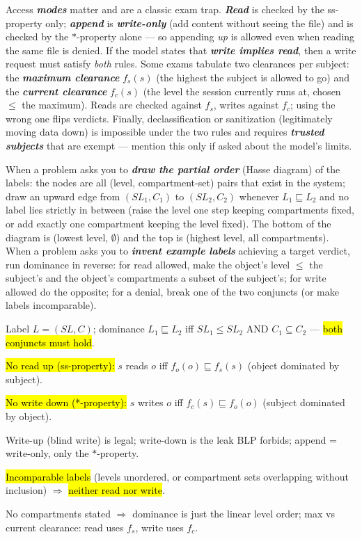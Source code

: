 \documentclass[12pt, a4paper]{article}
\newcommand{\term}[1]{\textbf{\textit{#1}}}        %
\newcommand{\imp}[1]{\hl{#1}}                       %
\begin{document}
Access \term{modes} matter and are a classic exam trap. \term{Read} is checked by the ss-property only; \term{append} is \term{write-only} (add content without seeing the file) and is checked by the $*$-property alone --- so appending \emph{up} is allowed even when reading the same file is denied. If the model states that \term{write implies read}, then a write request must satisfy \emph{both} rules. Some exams tabulate two clearances per subject: the \term{maximum clearance} $f_s(s)$ (the highest the subject is allowed to go) and the \term{current clearance} $f_c(s)$ (the level the session currently runs at, chosen $\leq$ the maximum). Reads are checked against $f_s$, writes against $f_c$; using the wrong one flips verdicts. Finally, declassification or sanitization (legitimately moving data down) is impossible under the two rules and requires \term{trusted subjects} that are exempt --- mention this only if asked about the model's limits.

When a problem asks you to \term{draw the partial order} (Hasse diagram) of the labels: the nodes are all (level, compartment-set) pairs that exist in the system; draw an upward edge from $(SL_1, C_1)$ to $(SL_2, C_2)$ whenever $L_1 \sqsubseteq L_2$ and no label lies strictly in between (raise the level one step keeping compartments fixed, or add exactly one compartment keeping the level fixed). The bottom of the diagram is (lowest level, $\emptyset$) and the top is (highest level, all compartments). When a problem asks you to \term{invent example labels} achieving a target verdict, run dominance in reverse: for read allowed, make the object's level $\leq$ the subject's and the object's compartments a subset of the subject's; for write allowed do the opposite; for a denial, break one of the two conjuncts (or make labels incomparable).

\begin{theorybox}
\begin{tightitem}
    \item Label $L = (SL, C)$; dominance $L_1 \sqsubseteq L_2$ iff $SL_1 \leq SL_2$ AND $C_1 \subseteq C_2$ --- \imp{both conjuncts must hold}.
    \item \imp{No read up (ss-property):} $s$ reads $o$ iff $f_o(o) \sqsubseteq f_s(s)$ (object dominated by subject).
    \item \imp{No write down (*-property):} $s$ writes $o$ iff $f_c(s) \sqsubseteq f_o(o)$ (subject dominated by object).
    \item Write-up (blind write) is legal; write-down is the leak BLP forbids; append = write-only, only the $*$-property.
    \item \imp{Incomparable labels} (levels unordered, or compartment sets overlapping without inclusion) $\Rightarrow$ \imp{neither read nor write}.
    \item No compartments stated $\Rightarrow$ dominance is just the linear level order; max vs current clearance: read uses $f_s$, write uses $f_c$.
\end{tightitem}
\end{theorybox}
\end{document}
